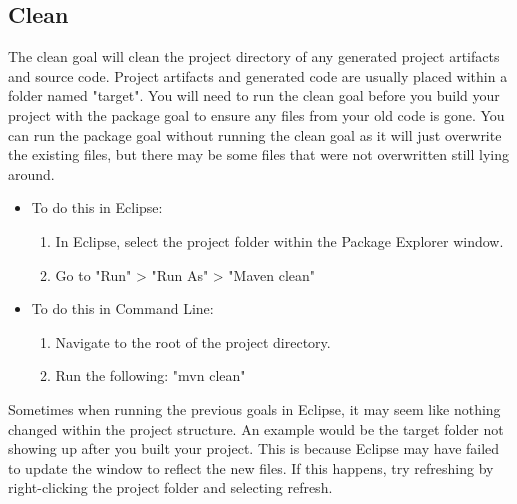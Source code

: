 \documentclass{article}
\begin{document}
\subsection{Clean}
The clean goal will clean the project directory of any generated project artifacts and source code. Project artifacts and generated code are usually placed within a folder named "target". You will need to run the clean goal before you build your project with the package goal to ensure any files from your old code is gone. You can run the package goal without running the clean goal as it will just overwrite the existing files, but there may be some files that were not overwritten still lying around.
\begin{itemize}
\item To do this in Eclipse:
	\begin{enumerate}
	\item In Eclipse, select the project folder within the Package Explorer window.
	\item Go to "Run" > "Run As" > "Maven clean"
	\end{enumerate}
\item To do this in Command Line:
	\begin{enumerate}
	\item Navigate to the root of the project directory.
	\item Run the following: "mvn clean"
	\end{enumerate}
\end{itemize}
\begin{info}[Note:]
Sometimes when running the previous goals in Eclipse, it may seem like nothing changed within the project structure. An example would be the target folder not showing up after you built your project. This is because Eclipse may have failed to update the window to reflect the new files. If this happens, try refreshing by right-clicking the project folder and selecting refresh. 
\end{info}


\end{document}
